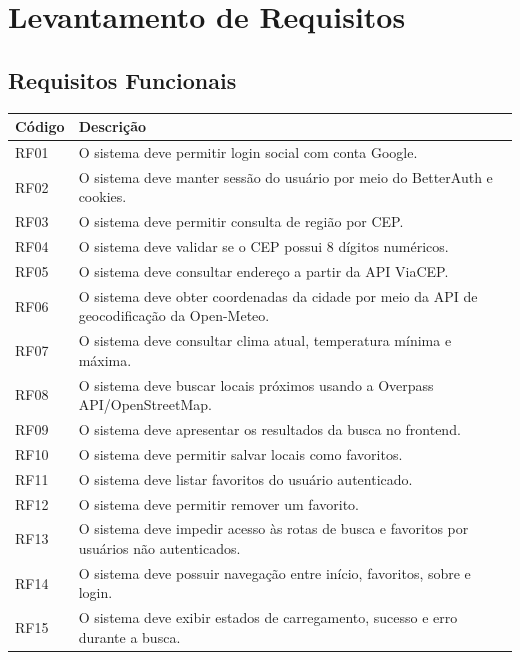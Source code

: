 \documentclass[
    12pt,
    oneside,
    openright,
    a4paper,
    english,
    brazil
]{abntex2}
\begin{document}

\chapter{Levantamento de Requisitos}

\section{Requisitos Funcionais}

\begin{longtable}{|p{2cm}|p{12cm}|}
\hline
\textbf{Código} & \textbf{Descrição} \\
\hline
RF01 & O sistema deve permitir login social com conta Google. \\
\hline
RF02 & O sistema deve manter sessão do usuário por meio do BetterAuth e cookies. \\
\hline
RF03 & O sistema deve permitir consulta de região por CEP. \\
\hline
RF04 & O sistema deve validar se o CEP possui 8 dígitos numéricos. \\
\hline
RF05 & O sistema deve consultar endereço a partir da API ViaCEP. \\
\hline
RF06 & O sistema deve obter coordenadas da cidade por meio da API de geocodificação da Open-Meteo. \\
\hline
RF07 & O sistema deve consultar clima atual, temperatura mínima e máxima. \\
\hline
RF08 & O sistema deve buscar locais próximos usando a Overpass API/OpenStreetMap. \\
\hline
RF09 & O sistema deve apresentar os resultados da busca no frontend. \\
\hline
RF10 & O sistema deve permitir salvar locais como favoritos. \\
\hline
RF11 & O sistema deve listar favoritos do usuário autenticado. \\
\hline
RF12 & O sistema deve permitir remover um favorito. \\
\hline
RF13 & O sistema deve impedir acesso às rotas de busca e favoritos por usuários não autenticados. \\
\hline
RF14 & O sistema deve possuir navegação entre início, favoritos, sobre e login. \\
\hline
RF15 & O sistema deve exibir estados de carregamento, sucesso e erro durante a busca. \\
\hline
\end{longtable}
\end{document}
